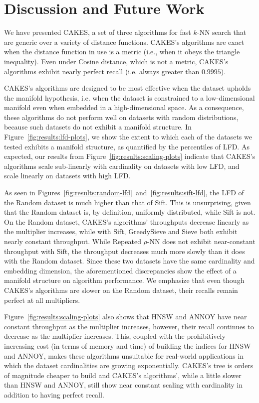 \section{Discussion and Future Work}
\label{sec:discussion}

We have presented CAKES, a set of three algorithms for fast $k$-NN search that are generic over a variety of distance functions.
CAKES's algorithms are exact when the distance function in use is a metric (i.e., when it obeys the triangle inequality).
Even under Cosine distance, which is not a metric, CAKES's algorithms exhibit nearly perfect recall (i.e. always greater than $0.9995$).

CAKES's algorithms are designed to be most effective when the dataset upholds the manifold hypothesis, i.e. when the dataset is constrained to a low-dimensional manifold even when embedded in a high-dimensional space.
As a consequence, these algorithms do not perform well on datasets with random distributions, because such datasets do not exhibit a manifold structure.
In Figure~\ref{fig:results:lfd-plots}, we show the extent to which each of the datasets we tested exhibits a manifold structure, as quantified by the percentiles of LFD.
As expected, our results from Figure~\ref{fig:results:scaling-plots} indicate that CAKES's algorithms scale sub-linearly with cardinality on datasets with low LFD, and scale linearly on datasets with high LFD.

As seen in Figures~\ref{fig:results:random-lfd}~and~\ref{fig:results:sift-lfd}, the LFD of the Random dataset is much higher than that of Sift.
This is unsurprising, given that the Random dataset is, by definition, uniformly distributed, while Sift is not.
On the Random dataset, CAKES's algorithms' throughputs decrease linearly as the multiplier increases, while with Sift, GreedySieve and Sieve both exhibit nearly constant throughput.
While Repeated $\rho$-NN does not exhibit near-constant throughput with Sift, the throughput decreases much more slowly than it does with the Random dataset.
Since these two datasets have the same cardinality and embedding dimension, the aforementioned discrepancies show the effect of a manifold structure on algorithm performance.
We emphasize that even though CAKES's algorithms are slower on the Random dataset, their recalls remain perfect at all multipliers.

Figure~\ref{fig:results:scaling-plots} also shows that HNSW and ANNOY have near constant throughput as the multiplier increases, however, their recall continues to decrease as the multiplier increases.
This, coupled with the prohibitively increasing cost (in terms of memory and time) of building the indices for HNSW and ANNOY, makes these algorithms unsuitable for real-world applications in which the dataset cardinalities are growing exponentially.
CAKES's tree is orders of magnitude cheaper to build and CAKES's algorithms', while a little slower than HNSW and ANNOY, still show near constant scaling with cardinality in addition to having perfect recall.

